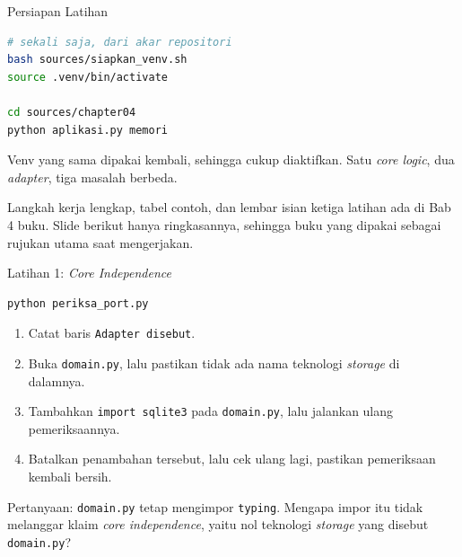 \documentclass[aspectratio=169, table, 12pt]{beamer}
\begin{document}
\begin{frame}[fragile]{{\Large Persiapan Latihan}}
  \vspace{5pt}
\begin{lstlisting}[language=bash]
# sekali saja, dari akar repositori
bash sources/siapkan_venv.sh
source .venv/bin/activate

cd sources/chapter04
python aplikasi.py memori
\end{lstlisting}

  \vspace{5pt}
  {\small Venv yang sama dipakai kembali, sehingga cukup diaktifkan. Satu
  \textit{core logic}, dua \textit{adapter}, tiga masalah berbeda.}

  \vspace{4pt}
  {\small Langkah kerja lengkap, tabel contoh, dan lembar isian ketiga latihan
  ada di Bab 4 buku. Slide berikut hanya ringkasannya, sehingga buku yang
  dipakai sebagai rujukan utama saat mengerjakan.}
\end{frame}

\begin{frame}[fragile]{{\Large Latihan 1: \textit{Core Independence}}}
  \vspace{3pt}
\begin{lstlisting}[language=bash]
python periksa_port.py
\end{lstlisting}

  \vspace{3pt}
  \begin{enumerate}
    \item Catat baris \texttt{Adapter disebut}.
    \item Buka \texttt{domain.py}, lalu pastikan tidak ada nama teknologi
      \textit{storage} di dalamnya.
    \item Tambahkan \texttt{import sqlite3} pada \texttt{domain.py}, lalu
      jalankan ulang pemeriksaannya.
    \item Batalkan penambahan tersebut, lalu cek ulang lagi, pastikan
      pemeriksaan kembali bersih.
  \end{enumerate}

  \vspace{3pt}
  {\small Pertanyaan: \texttt{domain.py} tetap mengimpor \texttt{typing}.
  Mengapa impor itu tidak melanggar klaim \textit{core independence}, yaitu nol
  teknologi \textit{storage} yang disebut \texttt{domain.py}?}
\end{frame}
\end{document}
